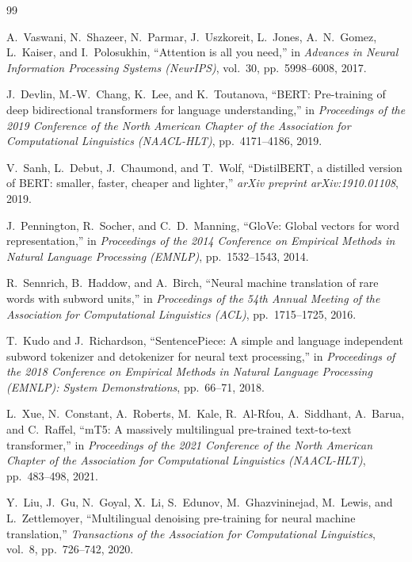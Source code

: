 \documentclass[12pt,a4paper]{report}
\begin{document}
\begin{thebibliography}{99}

A.~Vaswani, N.~Shazeer, N.~Parmar, J.~Uszkoreit, L.~Jones, A.~N.~Gomez, L.~Kaiser, and I.~Polosukhin,
``Attention is all you need,''
in \emph{Advances in Neural Information Processing Systems (NeurIPS)}, vol.~30, pp.~5998--6008, 2017.

J.~Devlin, M.-W.~Chang, K.~Lee, and K.~Toutanova,
``BERT: Pre-training of deep bidirectional transformers for language understanding,''
in \emph{Proceedings of the 2019 Conference of the North American Chapter of the Association for Computational Linguistics (NAACL-HLT)}, pp.~4171--4186, 2019.

V.~Sanh, L.~Debut, J.~Chaumond, and T.~Wolf,
``DistilBERT, a distilled version of BERT: smaller, faster, cheaper and lighter,''
\emph{arXiv preprint arXiv:1910.01108}, 2019.

J.~Pennington, R.~Socher, and C.~D.~Manning,
``GloVe: Global vectors for word representation,''
in \emph{Proceedings of the 2014 Conference on Empirical Methods in Natural Language Processing (EMNLP)}, pp.~1532--1543, 2014.

R.~Sennrich, B.~Haddow, and A.~Birch,
``Neural machine translation of rare words with subword units,''
in \emph{Proceedings of the 54th Annual Meeting of the Association for Computational Linguistics (ACL)}, pp.~1715--1725, 2016.

T.~Kudo and J.~Richardson,
``SentencePiece: A simple and language independent subword tokenizer and detokenizer for neural text processing,''
in \emph{Proceedings of the 2018 Conference on Empirical Methods in Natural Language Processing (EMNLP): System Demonstrations}, pp.~66--71, 2018.

L.~Xue, N.~Constant, A.~Roberts, M.~Kale, R.~Al-Rfou, A.~Siddhant, A.~Barua, and C.~Raffel,
``mT5: A massively multilingual pre-trained text-to-text transformer,''
in \emph{Proceedings of the 2021 Conference of the North American Chapter of the Association for Computational Linguistics (NAACL-HLT)}, pp.~483--498, 2021.

Y.~Liu, J.~Gu, N.~Goyal, X.~Li, S.~Edunov, M.~Ghazvininejad, M.~Lewis, and L.~Zettlemoyer,
``Multilingual denoising pre-training for neural machine translation,''
\emph{Transactions of the Association for Computational Linguistics}, vol.~8, pp.~726--742, 2020.


\end{thebibliography}
\end{document}
